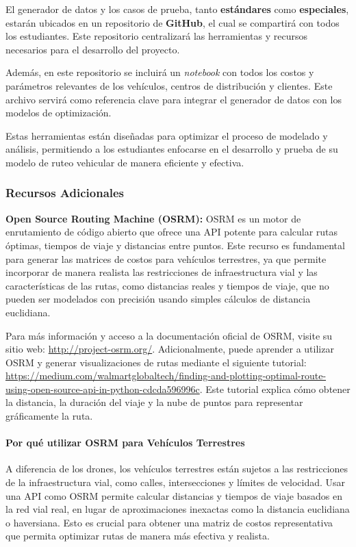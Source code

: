 \documentclass[12pt]{article}
\begin{document}
El generador de datos y los casos de prueba, tanto \textbf{estándares} como \textbf{especiales}, estarán ubicados en un repositorio de \textbf{GitHub}, el cual se compartirá con todos los estudiantes. Este repositorio centralizará las herramientas y recursos necesarios para el desarrollo del proyecto.

Además, en este repositorio se incluirá un \textit{notebook} con todos los costos y parámetros relevantes de los vehículos, centros de distribución y clientes. Este archivo servirá como referencia clave para integrar el generador de datos con los modelos de optimización.

Estas herramientas están diseñadas para optimizar el proceso de modelado y análisis, permitiendo a los estudiantes enfocarse en el desarrollo y prueba de su modelo de ruteo vehicular de manera eficiente y efectiva.

\subsubsection{Recursos Adicionales}

\textbf{Open Source Routing Machine (OSRM):}  
OSRM es un motor de enrutamiento de código abierto que ofrece una API potente para calcular rutas óptimas, tiempos de viaje y distancias entre puntos. Este recurso es fundamental para generar las matrices de costos para vehículos terrestres, ya que permite incorporar de manera realista las restricciones de infraestructura vial y las características de las rutas, como distancias reales y tiempos de viaje, que no pueden ser modelados con precisión usando simples cálculos de distancia euclidiana.

Para más información y acceso a la documentación oficial de OSRM, visite su sitio web: \url{http://project-osrm.org/}. Adicionalmente, puede aprender a utilizar OSRM y generar visualizaciones de rutas mediante el siguiente tutorial: \url{https://medium.com/walmartglobaltech/finding-and-plotting-optimal-route-using-open-source-api-in-python-cdcda596996c}. Este tutorial explica cómo obtener la distancia, la duración del viaje y la nube de puntos para representar gráficamente la ruta.

\paragraph{Por qué utilizar OSRM para Vehículos Terrestres}
A diferencia de los drones, los vehículos terrestres están sujetos a las restricciones de la infraestructura vial, como calles, intersecciones y límites de velocidad. Usar una API como OSRM permite calcular distancias y tiempos de viaje basados en la red vial real, en lugar de aproximaciones inexactas como la distancia euclidiana o haversiana. Esto es crucial para obtener una matriz de costos representativa que permita optimizar rutas de manera más efectiva y realista.
\end{document}
